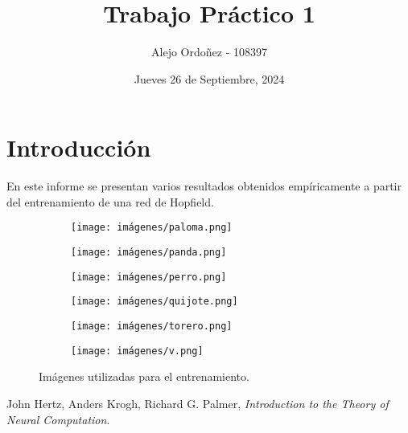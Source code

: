 \documentclass[a4paper,12pt]{article}
\title{Trabajo Práctico 1}
\author{Alejo Ordoñez - 108397}
\date{Jueves 26 de Septiembre, 2024}
\begin{document}
\maketitle

\newpage
\tableofcontents


\newpage
\section{Introducción}

En este informe se presentan varios resultados obtenidos empíricamente a partir del entrenamiento de una red de Hopfield.\textit{}


\begin{figure}[h]  %
    \centering
    \begin{subfigure}{0.3\textwidth}
        \centering
        \texttt{[image: imágenes/paloma.png]}  %
    \end{subfigure}
    \hfill
    \begin{subfigure}{0.3\textwidth}
        \centering
        \texttt{[image: imágenes/panda.png]}
    \end{subfigure}
    \hfill
    \begin{subfigure}{0.3\textwidth}
        \centering
        \texttt{[image: imágenes/perro.png]}
    \end{subfigure}
    
    \begin{subfigure}{0.3\textwidth}
        \centering
        \texttt{[image: imágenes/quijote.png]}
    \end{subfigure}
    \hfill
    \begin{subfigure}{0.3\textwidth}
        \centering
        \texttt{[image: imágenes/torero.png]}
    \end{subfigure}
    \hfill
    \begin{subfigure}{0.3\textwidth}
        \centering
        \texttt{[image: imágenes/v.png]}
    \end{subfigure}
    
    \caption{Imágenes utilizadas para el entrenamiento.}
    \label{fig:imagenes}
\end{figure}

\begin{thebibliography}{9}

John Hertz, Anders Krogh, Richard G. Palmer, \textit{Introduction to the Theory of Neural Computation}.

\end{thebibliography}
\end{document}
